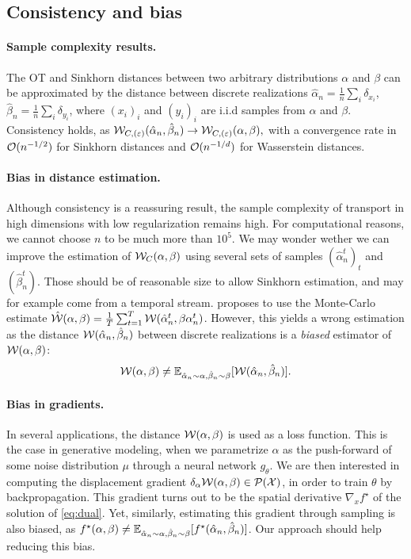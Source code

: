\subsection{Consistency and bias}

\paragraph{Sample complexity results.} The OT and Sinkhorn distances between two arbitrary distributions
$\alpha$ and $\beta$ can be approximated by the distance between discrete
realizations $\hat \alpha_n = \frac{1}{n} \sum_i \delta_{x_i}$, 
$\hat \beta_n = \frac{1}{n} \sum_i \delta_{y_i}$, where $(x_i)_i$
and $(y_i)_i$ are i.i.d samples from $\alpha$ and $\beta$. Consistency holds, as
$\mathcal{W}_{C, (\varepsilon)}(\hat \alpha_n, \hat \beta_n) \to \mathcal{W}_{C, (\varepsilon)}(\alpha, \beta),$
with a convergence rate in $\mathcal{O}(n^{-1/2})$ for Sinkhorn distances and $\mathcal{O}(n^{-1/d})$ for
Wasserstein distances.

\paragraph{Bias in distance estimation.} Although consistency is a reassuring
result, the sample complexity of transport in high dimensions with low
regularization remains high. For computational reasons, we cannot choose $n$ to
be much more than $10^5$. We may wonder wether we can improve the estimation of
$\mathcal{W}_{C}(\alpha,\beta)$ using several sets of samples $(\hat \alpha_n^t)_t$ and
$(\hat \beta_n^t)$. Those should be of reasonable size to allow Sinkhorn
estimation, and may for example come from a temporal stream.
\cite{2018-Genevay-aistats} proposes to use the Monte-Carlo estimate $\hat
{\mathcal{W}}(\alpha, \beta) = \frac{1}{T} \sum_{t=1}^T \mathcal{W}(\hat \alpha_n^t, \beta
\alpha_n^t)$. However, this yields a wrong estimation as the distance $\mathcal{W}(\hat
\alpha_n, \hat \beta_n)$ between discrete realizations is a \textit{biased}
estimator of $\mathcal{W}(\alpha, \beta)$:
\begin{equation}
    \mathcal{W}(\alpha, \beta) \neq 
    \mathbb{E}_{\hat \alpha_n \sim \alpha, \hat \beta_n \sim \beta} [\mathcal{W}(\hat \alpha_n, \hat \beta_n)].
\end{equation}

\paragraph{Bias in gradients.} In several applications, the distance
$\mathcal{W}(\alpha, \beta)$ is used as a loss function. This is the case in generative
modeling, when we parametrize $\alpha$ as the push-forward of some noise
distribution $\mu$ through a neural network $g_\theta$. We are then interested
in computing the displacement gradient $\delta_\alpha \mathcal{W}(\alpha, \beta) \in
\mathcal{P}(\mathcal{X})$, in order to train $\theta$ by backpropagation. This gradient turns
out to be the spatial derivative $\nabla_x f^\star$ of the solution of
\eqref{eq:dual}. Yet, similarly, estimating this gradient through sampling is
also biased, as $f^\star(\alpha, \beta) \neq \mathbb{E}_{\hat \alpha_n \sim \alpha,
\hat \beta_n \sim \beta}[f^\star(\hat \alpha_n, \hat \beta_n)]$.  Our approach
should help reducing this bias.

\hfill